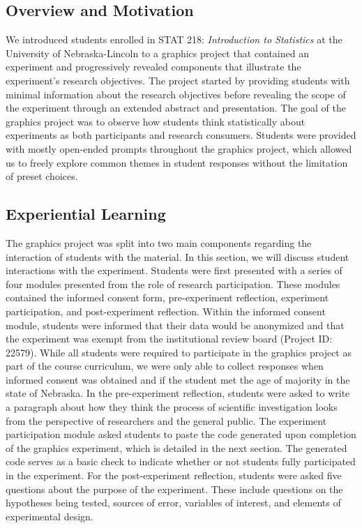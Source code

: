 \documentclass[phd]{nuthesis}
\begin{document}
\subsection{Overview and Motivation}\label{overview-and-motivation}

We introduced students enrolled in STAT 218: \emph{Introduction to
Statistics} at the University of Nebraska-Lincoln to a graphics project
that contained an experiment and progressively revealed components that
illustrate the experiment's research objectives. The project started by
providing students with minimal information about the research
objectives before revealing the scope of the experiment through an
extended abstract and presentation. The goal of the graphics project was
to observe how students think statistically about experiments as both
participants and research consumers. Students were provided with mostly
open-ended prompts throughout the graphics project, which allowed us to
freely explore common themes in student responses without the limitation
of preset choices.

\subsection{Experiential Learning}\label{experiential-learning}

The graphics project was split into two main components regarding the
interaction of students with the material. In this section, we will
discuss student interactions with the experiment. Students were first
presented with a series of four modules presented from the role of
research participation. These modules contained the informed consent
form, pre-experiment reflection, experiment participation, and
post-experiment reflection. Within the informed consent module, students
were informed that their data would be anonymized and that the
experiment was exempt from the institutional review board (Project ID:
22579). While all students were required to participate in the graphics
project as part of the course curriculum, we were only able to collect
responses when informed consent was obtained and if the student met the
age of majority in the state of Nebraska. In the pre-experiment
reflection, students were asked to write a paragraph about how they
think the process of scientific investigation looks from the perspective
of researchers and the general public. The experiment participation
module asked students to paste the code generated upon completion of the
graphics experiment, which is detailed in the next section. The
generated code serves as a basic check to indicate whether or not
students fully participated in the experiment. For the post-experiment
reflection, students were asked five questions about the purpose of the
experiment. These include questions on the hypotheses being tested,
sources of error, variables of interest, and elements of experimental
design.
\end{document}
